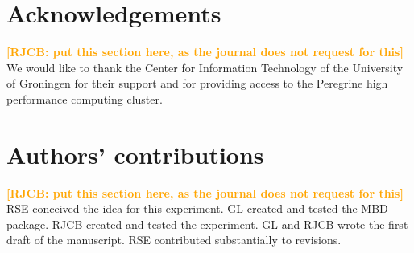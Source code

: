 \documentclass{article}
\newcommand*\richel[1]{\textcolor{orange}{\textbf{[RJCB: #1]}}}
\begin{document}
\section{Acknowledgements}

\richel{put this section here, as the journal does not request for this}
We would like to thank the Center for Information Technology of the University of Groningen for their support
and for providing access to the Peregrine high performance computing cluster.

\section{Authors' contributions}

\richel{put this section here, as the journal does not request for this}
RSE conceived the idea for this experiment.
GL created and tested the MBD package.
RJCB created and tested the experiment.
GL and RJCB wrote the first draft of the manuscript. 
RSE contributed substantially to revisions.
\end{document}
